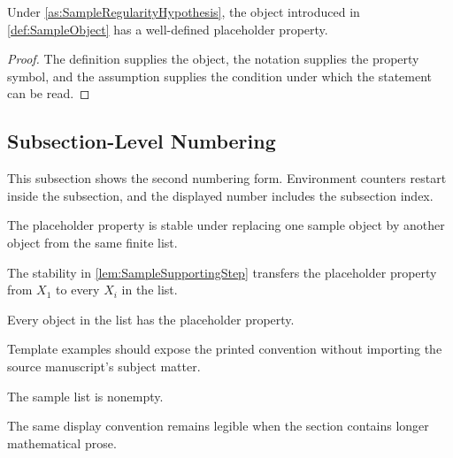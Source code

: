 \documentclass[12pt,oneside]{report}
\begin{document}
\begin{theorem}\label{thm:SampleConclusion}
Under \cref{as:SampleRegularityHypothesis}, the object introduced in
\cref{def:SampleObject} has a well-defined placeholder property.
\end{theorem}

\begin{proof}
The definition supplies the object, the notation supplies the property symbol,
and the assumption supplies the condition under which the statement can be read.
\end{proof}

\subsection{Subsection-Level Numbering}\label{sub:SubsectionLevelNumbering}
This subsection shows the second numbering form. Environment counters restart
inside the subsection, and the displayed number includes the subsection index.

\begin{lemma}\label{lem:SampleSupportingStep}
The placeholder property is stable under replacing one sample object by another
object from the same finite list.
\end{lemma}

\begin{proposition}\label{prop:SampleTransfer}
The stability in \cref{lem:SampleSupportingStep} transfers the placeholder
property from \(X_1\) to every \(X_i\) in the list.
\end{proposition}

\begin{corollary}\label{cor:SampleConsequence}
Every object in the list has the placeholder property.
\end{corollary}

\begin{principle}\label{prin:SampleReadingRule}
Template examples should expose the printed convention without importing the
source manuscript's subject matter.
\end{principle}

\begin{axiom}\label{ax:SampleStartingPremise}
The sample list is nonempty.
\end{axiom}

\begin{conjecture}\label{con:SampleFutureClaim}
The same display convention remains legible when the section contains longer
mathematical prose.
\end{conjecture}
\end{document}
